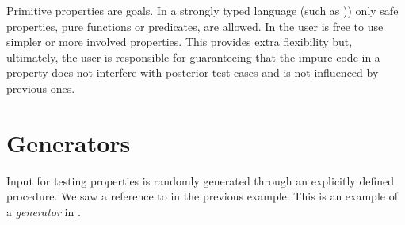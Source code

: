 

Primitive properties are \Prolog{} goals.
In a strongly typed language (such as \Haskell{}))
only
safe properties, pure functions or predicates, are allowed.
%
%
%
In \plqc{} the user is
free to use simpler or more involved
properties.
%
This provides extra flexibility but, ultimately, the user
is %
responsible for guaranteeing that the impure code in a property
does not interfere with posterior test
cases and is not influenced by previous ones.


\section{Generators}
\label{sec:generators}

Input for testing properties is randomly generated through an explicitly
defined procedure.
%
We saw a reference to  in the previous example.
%
This is an example of a \emph{generator} in \plqc{}.




